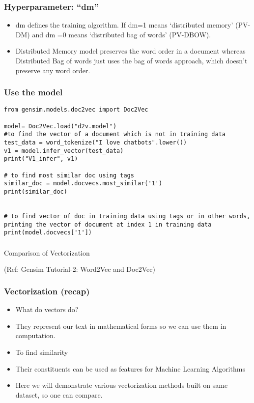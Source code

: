 \begin{frame}[fragile]\frametitle{Hyperparameter: ``dm''}
\begin{itemize}
\item dm defines the training algorithm. If dm=1 means ‘distributed memory’ (PV-DM) and dm =0 means ‘distributed bag of words’ (PV-DBOW). 
\item Distributed Memory model preserves the word order in a document whereas Distributed Bag of words just uses the bag of words approach, which doesn’t preserve any word order.
\end{itemize}

\end{frame}

\begin{frame}[fragile]\frametitle{Use the model}
\begin{lstlisting}
from gensim.models.doc2vec import Doc2Vec

model= Doc2Vec.load("d2v.model")
#to find the vector of a document which is not in training data
test_data = word_tokenize("I love chatbots".lower())
v1 = model.infer_vector(test_data)
print("V1_infer", v1)

# to find most similar doc using tags
similar_doc = model.docvecs.most_similar('1')
print(similar_doc)


# to find vector of doc in training data using tags or in other words, printing the vector of document at index 1 in training data
print(model.docvecs['1'])
\end{lstlisting}

\end{frame}


\begin{frame}[fragile]\frametitle{}

\begin{center}
{\Large Comparison of Vectorization}
\end{center}

{\tiny (Ref: Gensim Tutorial-2: Word2Vec and Doc2Vec)}
\end{frame}

\begin{frame}[fragile]\frametitle{Vectorization (recap)}
\begin{itemize}
\item What do vectors do? 
\item They represent our text in mathematical forms so we can use them in computation.
\item To find similarity
\item Their constituents can be used as features for Machine Learning Algorithms
\item Here we will demonstrate various vectorization methods built on same dataset, so one can compare.
\end{itemize}
\end{frame}


